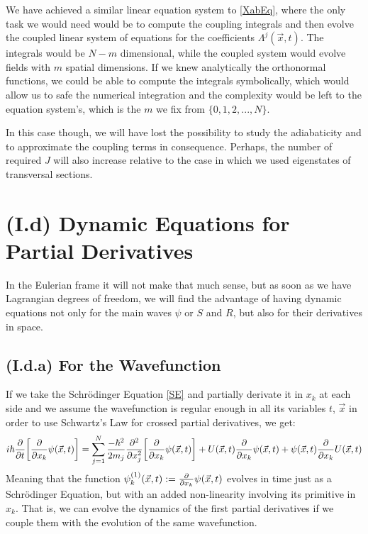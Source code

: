 \documentclass[11pt, a4paper]{article} %
\begin{document}
We have achieved a similar linear equation system to \eqref{XabEq}, where the only task we would need would be to compute the coupling integrals and then evolve the coupled linear system of equations for the coefficients $\Lambda^j(\vec{x},t)$. The integrals would be $N-m$ dimensional, while the coupled system would evolve fields with $m$ spatial dimensions. If we knew analytically the orthonormal functions, we could be able to compute the integrals symbolically, which would allow us to safe the numerical integration and the complexity would be left to the equation system's, which is the $m$ we fix from $\{0,1,2,...,N\}$.

In this case though, we will have lost the possibility to study the adiabaticity and to approximate the coupling terms in consequence. Perhaps, the number of required $J$ will also increase relative to the case in which we used eigenstates of transversal sections.
\vspace{-0.1cm}


\section*{(I.d) Dynamic Equations for Partial Derivatives\vspace{-0.2cm}}
In the Eulerian frame it will not make that much sense, but as soon as we have Lagrangian degrees of freedom, we will find the advantage of having dynamic equations not only for the main waves $\psi$ or $S$ and $R$, but also for their derivatives in space.\vspace{-0.4cm}

\subsection*{(I.d.a) For the Wavefunction}
\vspace{-0.2cm}
If we take the Schrödinger Equation \eqref{SE} and partially derivate it in $x_k$ at each side and we assume the wavefunction is regular enough in all its variables $t$, $\vec{x}$ in order to use Schwartz's Law for crossed partial derivatives, we get:
\begin{equation}
i\hbar \pdv{}{t}\qty[\pdv{}{x_k}\psi(\vec{x},t)] = \sum_{j=1}^N\frac{-\hbar^2}{2m_j}\pdv[2]{}{x_j}\qty[\pdv{}{x_k}\psi(\vec{x},t)]+U(\vec{x},t)\pdv{}{x_k}\psi(\vec{x},t) + \psi(\vec{x},t)\pdv{}{x_k}U(\vec{x},t)
\end{equation}
Meaning that the function $\psi^{(1)}_k(\vec{x},t):=\pdv{}{x_k}\psi(\vec{x},t)$ evolves in time just as a Schrödinger Equation, but with an added non-linearity involving its primitive in $x_k$. That is, we can evolve the dynamics of the first partial derivatives if we couple them with the evolution of the same wavefunction.
\end{document}
